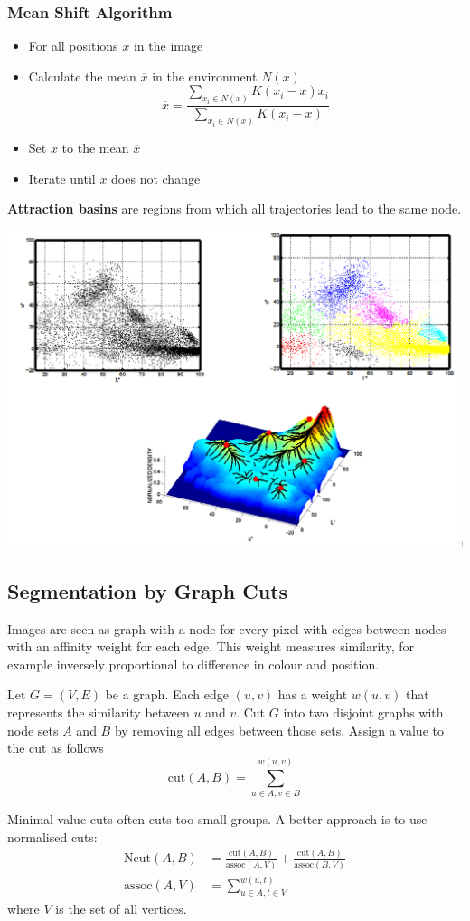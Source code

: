\documentclass[x11names,11pt,a4paper]{article}
\theoremstyle{definition}
\newcommand*\samplemean[1]{\overline{#1}}
\begin{document}
\subsubsection{Mean Shift Algorithm}
\begin{itemize}[label=-]
	\item[] For all positions $x$ in the image
	\item Calculate the mean $\samplemean{x}$ in the environment $N(x)$
	\begin{equation*}
		\samplemean{x} = \frac{\sum_{x_i \in N(x)} K(x_i - x) x_i }{\sum_{x_i \in N(x)} K(x_i - x)}
	\end{equation*}
	\item Set $x$ to the mean $\samplemean{x}$
	\item Iterate until $x$ does not change
\end{itemize}
\textbf{Attraction basins} are regions from which all trajectories lead to the same node.
\begin{center}
	\includegraphics[width=0.7\linewidth]{img/attraction_basins}
\end{center}

\subsection{Segmentation by Graph Cuts}
Images are seen as graph with a node for every pixel with edges between nodes with an affinity weight for each edge. This weight  measures similarity, for example inversely proportional to difference in colour and position.
\begin{definition}
	Let $G=(V,E)$ be a graph. Each edge $(u,v)$ has a weight $w(u,v)$ that represents the similarity between $u$ and $v$. Cut $G$ into two disjoint graphs with node sets $A$ and $B$ by removing all edges between those sets. Assign a value to the cut as follows
	\begin{equation*}
		\text{cut}(A,B) = \sum_{u\in A,v\in B}^{w(u,v)}
	\end{equation*}
\end{definition}
Minimal value cuts often cuts too small groups. A better approach is to use normalised cuts:
\begin{align*}
	\text{Ncut}(A,B) &= \frac{\text{cut}(A,B)}{\text{assoc}(A,V)} + \frac{\text{cut}(A,B)}{\text{assoc}(B,V)}\\
	\text{assoc}(A,V) &= \sum_{u\in A, t\in V}^{w(u,t)}
\end{align*}
where $V$ is the set of all vertices.
\end{document}

